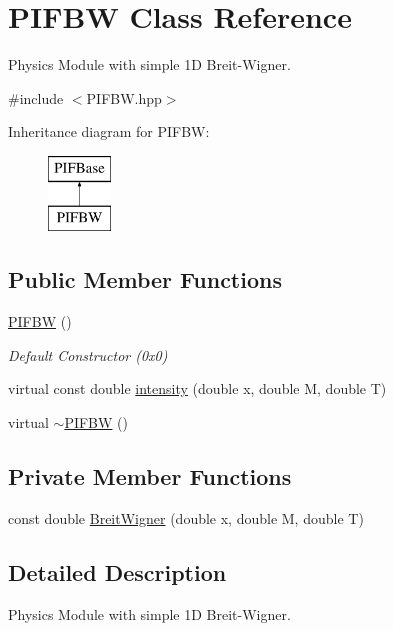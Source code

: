 \hypertarget{classPIFBW}{
\section{PIFBW Class Reference}
\label{d8/d58/classPIFBW}
}


Physics Module with simple 1D Breit-\/Wigner.  




{\ttfamily \#include $<$PIFBW.hpp$>$}

Inheritance diagram for PIFBW:\begin{figure}[H]
\begin{center}
\leavevmode
\includegraphics[height=2.000000cm]{d8/d58/classPIFBW}
\end{center}
\end{figure}
\subsection*{Public Member Functions}
\begin{DoxyCompactItemize}
\item 
\hyperlink{classPIFBW_a5dcb579e7810aedea4a13073415992e3}{PIFBW} ()
\begin{DoxyCompactList}\small\item\em Default Constructor (0x0) \end{DoxyCompactList}\item 
virtual const double \hyperlink{classPIFBW_a044bc6c62245217b03abcd9d7b4e9e25}{intensity} (double x, double M, double T)
\item 
virtual \hyperlink{classPIFBW_ae37b777b3d43bd6a78e07f8e971ba005}{$\sim$PIFBW} ()
\end{DoxyCompactItemize}
\subsection*{Private Member Functions}
\begin{DoxyCompactItemize}
\item 
const double \hyperlink{classPIFBW_a466dd8f3128a4ab2a9200ee44787dcef}{BreitWigner} (double x, double M, double T)
\end{DoxyCompactItemize}


\subsection{Detailed Description}
Physics Module with simple 1D Breit-\/Wigner. 

